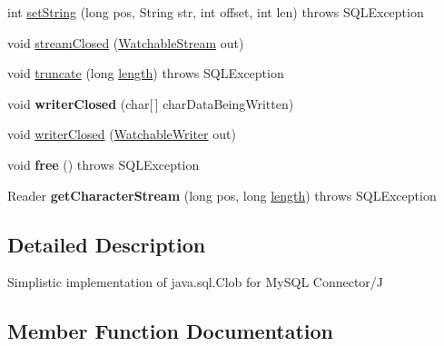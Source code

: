 \begin{DoxyCompactItemize}
\item 
int \mbox{\hyperlink{classcom_1_1mysql_1_1cj_1_1jdbc_1_1_clob_ad219cc0c1ae1ab62a8819a31382d6276}{set\+String}} (long pos, String str, int offset, int len)  throws S\+Q\+L\+Exception 
\item 
void \mbox{\hyperlink{classcom_1_1mysql_1_1cj_1_1jdbc_1_1_clob_afce3b43001378654ee8a1d99c8685eeb}{stream\+Closed}} (\mbox{\hyperlink{interfacecom_1_1mysql_1_1cj_1_1protocol_1_1_watchable_stream}{Watchable\+Stream}} out)
\item 
void \mbox{\hyperlink{classcom_1_1mysql_1_1cj_1_1jdbc_1_1_clob_a2038effd43fab99bf2553026fe76131c}{truncate}} (long \mbox{\hyperlink{classcom_1_1mysql_1_1cj_1_1jdbc_1_1_clob_a34d1c1c51a7cab4cb589c6743f78f3d1}{length}})  throws S\+Q\+L\+Exception 
\item 
\mbox{\label{classcom_1_1mysql_1_1cj_1_1jdbc_1_1_clob_a511b2df17d5336e806c022512c86e042}} 
void {\bfseries writer\+Closed} (char\mbox{[}$\,$\mbox{]} char\+Data\+Being\+Written)
\item 
void \mbox{\hyperlink{classcom_1_1mysql_1_1cj_1_1jdbc_1_1_clob_ab6d96b9b821f777e7b25850ceb480c2b}{writer\+Closed}} (\mbox{\hyperlink{classcom_1_1mysql_1_1cj_1_1protocol_1_1_watchable_writer}{Watchable\+Writer}} out)
\item 
\mbox{\label{classcom_1_1mysql_1_1cj_1_1jdbc_1_1_clob_ab87f9b3eae069b4b8d7d78f3532c17ec}} 
void {\bfseries free} ()  throws S\+Q\+L\+Exception 
\item 
\mbox{\label{classcom_1_1mysql_1_1cj_1_1jdbc_1_1_clob_a4ac4032fb87f049f6a0368706804cb18}} 
Reader {\bfseries get\+Character\+Stream} (long pos, long \mbox{\hyperlink{classcom_1_1mysql_1_1cj_1_1jdbc_1_1_clob_a34d1c1c51a7cab4cb589c6743f78f3d1}{length}})  throws S\+Q\+L\+Exception 
\end{DoxyCompactItemize}


\subsection{Detailed Description}
Simplistic implementation of java.\+sql.\+Clob for My\+S\+QL Connector/J 

\subsection{Member Function Documentation}
\mbox{\label{classcom_1_1mysql_1_1cj_1_1jdbc_1_1_clob_a207902fd33eb4765d5b102a6512a14fe}} 
